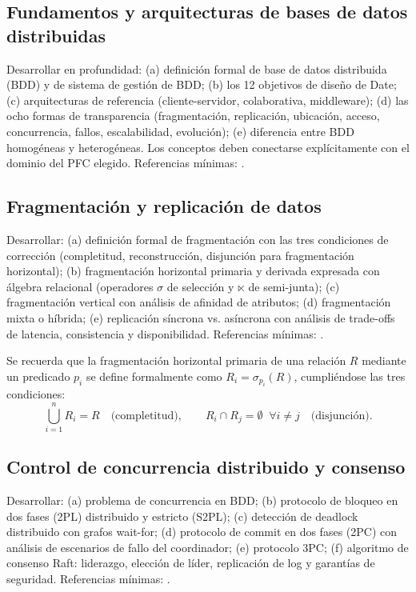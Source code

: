 \documentclass[11pt,a4paper]{article}
\begin{document}
\subsection{Fundamentos y arquitecturas de bases de datos distribuidas}

Desarrollar en profundidad: (a) definici\'on formal de base de datos distribuida (BDD) y de sistema de gesti\'on de BDD; (b) los 12 objetivos de dise\~no de Date; (c) arquitecturas de referencia (cliente-servidor, colaborativa, middleware); (d) las ocho formas de transparencia (fragmentaci\'on, replicaci\'on, ubicaci\'on, acceso, concurrencia, fallos, escalabilidad, evoluci\'on); (e) diferencia entre BDD homog\'eneas y heterog\'eneas. Los conceptos deben conectarse expl\'icitamente con el dominio del PFC elegido. Referencias m\'inimas: \parencite{OzsuValduriez2020,Kleppmann2017}.

\subsection{Fragmentaci\'on y replicaci\'on de datos}

Desarrollar: (a) definici\'on formal de fragmentaci\'on con las tres condiciones de correcci\'on (completitud, reconstrucci\'on, disjunci\'on para fragmentaci\'on horizontal); (b) fragmentaci\'on horizontal primaria y derivada expresada con \'algebra relacional (operadores $\sigma$ de selecci\'on y $\ltimes$ de semi-junta); (c) fragmentaci\'on vertical con an\'alisis de afinidad de atributos; (d) fragmentaci\'on mixta o h\'ibrida; (e) replicaci\'on s\'incrona vs. as\'incrona con an\'alisis de trade-offs de latencia, consistencia y disponibilidad. Referencias m\'inimas: \parencite{OzsuValduriez2020,Kleppmann2017,ViottiVukolic2016Consistency}.

Se recuerda que la fragmentaci\'on horizontal primaria de una relaci\'on $R$ mediante un predicado $p_i$ se define formalmente como $R_i = \sigma_{p_i}(R)$, cumpli\'endose las tres condiciones:
\begin{equation}
    \bigcup_{i=1}^{n} R_i = R \quad \text{(completitud)}, \qquad
    R_i \cap R_j = \emptyset \;\;\forall i \neq j \quad \text{(disjunci\'on)}.
\end{equation}

\subsection{Control de concurrencia distribuido y consenso}

Desarrollar: (a) problema de concurrencia en BDD; (b) protocolo de bloqueo en dos fases (2PL) distribuido y estricto (S2PL); (c) detecci\'on de deadlock distribuido con grafos wait-for; (d) protocolo de commit en dos fases (2PC) con an\'alisis de escenarios de fallo del coordinador; (e) protocolo 3PC; (f) algoritmo de consenso Raft: liderazgo, elecci\'on de l\'ider, replicaci\'on de log y garant\'ias de seguridad. Referencias m\'inimas: \parencite{OzsuValduriez2020,VanSteenTanenbaum2023DS,OngaroOusterhout2014Raft}.
\end{document}
